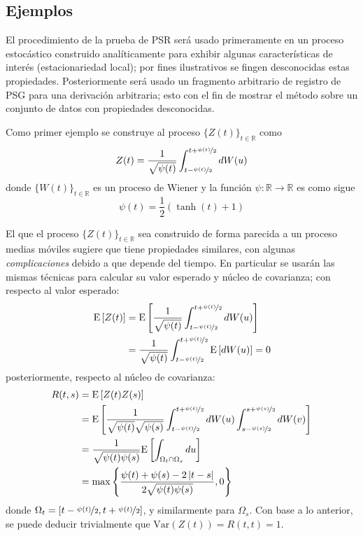 \documentclass[12pt,letterpaper]{book}
\newcommand{\R}{\mathbb{R}}
\newcommand{\E}[1]{\mathrm{E}\left[ #1 \right]}
\newcommand{\Var}[1]{\mathrm{Var}\left( #1 \right)}
\newcommand{\abso}[1]{\left| #1 \right|}
\begin{document}
\subsection{Ejemplos}
\label{sec:ejemplos}

El procedimiento de la prueba de PSR será usado primeramente en un proceso estocástico construido analíticamente para exhibir algunas características de interés (estacionariedad local); por fines ilustrativos se fingen desconocidas estas propiedades.
%
Posteriormente será usado un fragmento arbitrario de registro de PSG para una derivación arbitraria; esto con el fin de mostrar el método sobre un conjunto de datos con propiedades desconocidas.

Como primer ejemplo se construye al proceso $\{Z(t)\}_{t\in\R}$ como
\begin{equation}
Z(t) = \frac{1}{\sqrt{\psi(t)}} \int_{t-\nicefrac{\psi(t)}{2}}^{t+\nicefrac{\psi(t)}{2}} dW(u) 
\label{lazy20}
\end{equation}
donde $\{W(t)\}_{t\in\R}$ es un proceso de Wiener y la función $\psi:\R\rightarrow\R$ es como sigue
\begin{equation}
\psi(t) = \frac{1}{2} \left( \tanh(t) + 1 \right)
\end{equation}

El que el proceso $\{Z(t)\}_{t\in\R}$ sea construido de forma parecida a un proceso medias móviles sugiere que tiene propiedades similares, con algunas \textit{complicaciones} debido a que depende del tiempo.
%
En particular se usarán las mismas técnicas para calcular su valor esperado y núcleo de covarianza; con respecto al valor esperado:
\begin{align*}
\E{Z(t)} &= 
\E{\frac{1}{\sqrt{\psi(t)}} \int_{t-\nicefrac{\psi(t)}{2}}^{t+\nicefrac{\psi(t)}{2}} dW(u)} \\
&=
\frac{1}{\sqrt{\psi(t)}} \int_{t-\nicefrac{\psi(t)}{2}}^{t+\nicefrac{\psi(t)}{2}} \E{dW(u)} = 0
\end{align*}
posteriormente, respecto al núcleo de covarianza:
\begin{align*}
R(t,s) &= \E{Z(t)Z(s)} \\
&=
\E{\frac{1}{\sqrt{\psi(t)}\sqrt{\psi(s)}}
\int_{t-\nicefrac{\psi(t)}{2}}^{t+\nicefrac{\psi(t)}{2}} dW(u)
\int_{s-\nicefrac{\psi(s)}{2}}^{s+\nicefrac{\psi(s)}{2}} dW(v)
} \\
&= 
\frac{1}{\sqrt{\psi(t) \psi(s)}}
\E{\int_{\Omega_t \cap \Omega_s} du} \\
&= \max{ \left\{ \frac{\psi(t) + \psi(s) - 2 \abso{t-s}}{2\sqrt{\psi(t)\psi(s)}}, 0 \right\} }
\end{align*}
donde $\Omega_t = \left[ t-\nicefrac{\psi(t)}{2} , t+\nicefrac{\psi(t)}{2} \right]$, y similarmente para $\Omega_s$.
%
Con base a lo anterior, se puede deducir trivialmente que $\Var{Z(t)} = R(t,t) = 1$.
\end{document}
